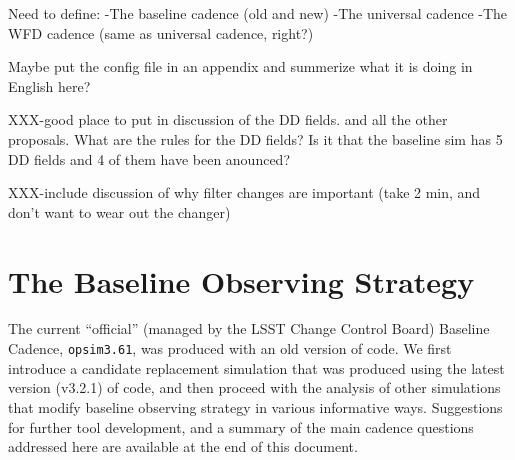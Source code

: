 Need to define:
    -The baseline cadence (old and new) %
    -The universal cadence
    -The WFD cadence (same as universal cadence, right?)

Maybe put the config file in an appendix and summerize what it is doing in English here?

XXX-good place to put in discussion of the DD fields. and all the other proposals.  What are the rules for the DD fields? Is it that the baseline sim has 5 DD fields and 4 of them have been anounced?

XXX-include discussion of why filter changes are important (take 2 min, and don't want to wear out the changer)

\section{The Baseline Observing Strategy}
\def\secname{cadexp:baseline}\label{sec:\secname}

The current ``official'' (managed by the LSST Change Control Board)
Baseline Cadence, \texttt{opsim3.61},  was produced with an old version of
\OpSim code. We first introduce a candidate replacement simulation
that was produced using  the latest version (v3.2.1) of \OpSim code,
and then proceed with the analysis of other simulations that modify baseline
observing strategy in various informative ways. Suggestions for
further tool development, and a summary of the main cadence questions
addressed here are available at the end of this document.





